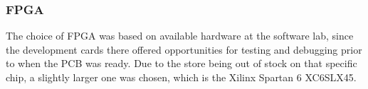 
\subsubsection{FPGA}

The choice of FPGA was based on available hardware at the software lab, since
the development cards there offered opportunities for testing and debugging
prior to when the PCB was ready. Due to the store being out of stock on that
specific chip, a slightly larger one was chosen, which is the Xilinx Spartan 6
XC6SLX45.
